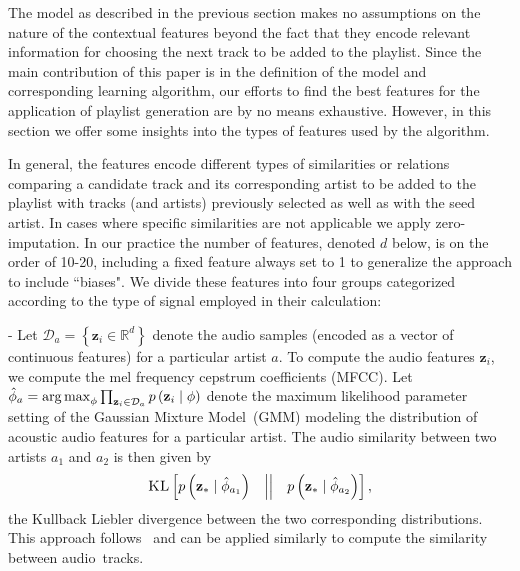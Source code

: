The model as described in the previous section makes no assumptions on the nature of the contextual features beyond the fact that they encode relevant information for choosing the next track to be added to the playlist.  
Since the main contribution of this paper is in the definition of the model and corresponding learning algorithm, our efforts to find the best features for the application of playlist generation are by no means exhaustive. 
However, in this section we offer some insights into the types of features used by the algorithm.


In general, the features encode different types of similarities or relations  comparing a candidate track and its corresponding artist to be added to the playlist with tracks (and artists) previously selected as well as with the seed artist. In cases where specific similarities are not applicable we apply zero-imputation.
 In our practice the number of features, denoted $d$ below, is on the order of 10-20, including a fixed feature always set to 1 to generalize the approach to include ``biases". We divide these features into four groups categorized according to the type of signal employed in their calculation:

 -
Let $\mathcal{D}_a=\left\{\mathbf{z}_i \in \mathbb{R}^d\right\}$ denote the audio samples (encoded as a vector of continuous features) for a particular artist $a$. To compute the audio features $\mathbf{z}_i$, we compute the mel frequency cepstrum coefficients (MFCC). Let $\hat{\phi}_a=\argmax_{\phi} \prod_{\mathbf{z}_i\in\mathcal{D}_a} p\left(\mathbf{z}_i\mid\phi\right)$ denote the maximum likelihood parameter setting of the Gaussian Mixture Model~(GMM)  modeling the distribution of acoustic audio features for a particular artist. The audio similarity between two artists $a_1$ and $a_2$ is then given by \begin{equation}\textsc{KL}\left[ p\left(\mathbf{z_*}\mid\hat{\phi}_{a_1}\right) \quad \middle| \middle| \quad  p\left(\mathbf{z_*} \mid \hat{\phi}_{a_2}\right)\right
],\end{equation} the Kullback Liebler divergence between the two corresponding distributions.  This approach follows~\cite{ReynoldsQD00} and can be applied similarly to compute the similarity between audio~tracks.

